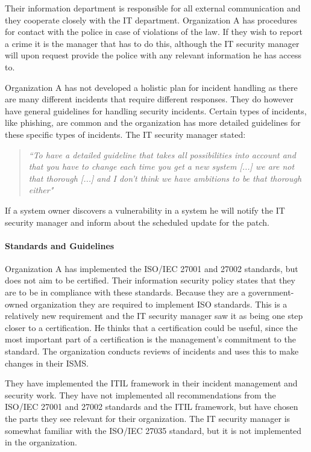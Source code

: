 Their information department is responsible for all external communication and they cooperate closely with the IT department. Organization A has procedures for contact with the police in case of violations of the law. If they wish to report a crime it is the manager that has to do this, although the IT security manager will upon request provide the police with any relevant information he has access to. 

Organization A has not developed a holistic plan for incident handling as there are many different incidents that require different responses. They do however have general guidelines for handling security incidents. Certain types of incidents, like phishing, are common and the organization has more detailed guidelines for these specific types of incidents. The IT security manager stated:

\begin{quote}
\textit{``To have a detailed guideline that takes all possibilities into account and that you have to change each time you get a new system %
[...] we are not that thorough [...] and I don't think we have ambitions to be that thorough either"}
\end{quote}

If a system owner discovers a vulnerability in a system he will notify the IT security manager and inform about the scheduled update for the patch. 

\paragraph{Standards and Guidelines}
Organization A has implemented the \acs{ISO}/\acs{IEC} 27001 and 27002 standards, but does not aim to be certified. Their information security policy states that they are to be in compliance with these standards. Because they are a government-owned organization they are required to implement \acs{ISO} standards. This is a relatively new requirement and the IT security manager saw it as being one step closer to a certification. He thinks that a certification could be useful, since the most important part of a certification is the management's commitment to the standard. The organization conducts reviews of incidents and uses this to make changes in their \ac{ISMS}. 

They have implemented the \ac{ITIL} framework in their incident management and security work. They have not implemented all recommendations from the \acs{ISO}/\acs{IEC} 27001 and 27002 standards and the \ac{ITIL} framework, but have chosen the parts they see relevant for their organization. The IT security manager is somewhat familiar with the \acs{ISO}/\acs{IEC} 27035 standard, but it is not implemented in the organization.

